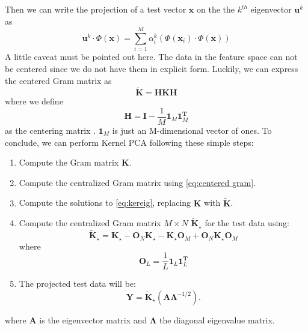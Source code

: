 \documentclass[7 pt]{article}
\begin{document}
\begin{multicols}{2}
 Then we can write the projection of a test vector $\mathbf{x}$ on the the $k^{th}$ eigenvector $\mathbf{u}^{k}$ as 
 \begin{equation}
 \mathbf{u}^{k} \cdot  \Phi(\mathbf{x})=\sum_{i=1}^{M} \alpha_{i}^{k} (\Phi(\mathbf{x}_{i}) \cdot \Phi(\mathbf{x}))
\end{equation}  
A little caveat must be pointed out here. The data in the feature space can not be centered since we do not have them in explicit form. Luckily, we can express the centered Gram matrix as
\begin{equation}
\label{eq:centered gram} 
\mathbf{\tilde{K}}= \mathbf{HKH} 
\end{equation}
where we define
\begin{equation}
\mathbf{H}=\mathbf{I} - \frac{1}{M} \mathbf{1}_{M}\mathbf{1}^{\mathbf{T}}_{M}
\end{equation}
 as the centering matrix \cite{murph12}. $\mathbf{1}_{M}$ is just an M-dimensional vector of ones.
 To conclude, we can perform Kernel PCA following these simple steps:
 \begin{enumerate}
 \item  Compute the Gram matrix $\mathbf{K}$.
 \item  Compute the centralized Gram matrix using \eqref{eq:centered gram}.
 \item  Compute the solutions to  \eqref{eq:kereig}, replacing $\mathbf{K}$ with $\mathbf{\tilde{K}}$.
 \item  Compute the centralized Gram matrix $M \times N$ $\mathbf{\tilde{K}}_{\star}$ for the test data using:
 \begin{equation}
 \mathbf{\tilde{K}}_{\star}= \mathbf{{K}}_{\star}-\mathbf{O}_{N}\mathbf{{K}}_{\star} - \mathbf{{K}}_{\star} \mathbf{O}_{M} + \mathbf{O}_{N}\mathbf{{K}}_{\star} \mathbf{O}_{M}
 \end{equation}
 where 
 \begin{equation}
 \mathbf{O}_{L}= \frac{1}{L}\mathbf{1}_{L}\mathbf{1}_{L}^{\mathbf{T}}
 \end{equation}
 \item The projected test data will be: 
 \begin{equation}
 \mathbf{Y}=\mathbf{\tilde{K}_{\star}}(\mathbf{A\Lambda}^{-1/2}).
 \end{equation}
 \end{enumerate}
 
 where $\mathbf{A}$ is the eigenvector matrix and $\mathbf{\Lambda}$ the diagonal eigenvalue matrix.

\end{multicols}
\end{document}
